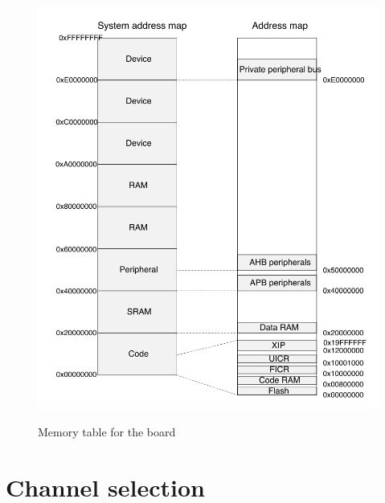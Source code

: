\documentclass{Configuration_Files/PoliMi3i_thesis}
\begin{document}
\begin{figure}[H]
\includegraphics[scale=0.4]{memory2.png}
\centering
\label{mem_table_2}
\caption{Memory table for the board \cite{NordicSemiconductorInfocenter}}
\end{figure}

\section{Channel selection}
\end{document}
